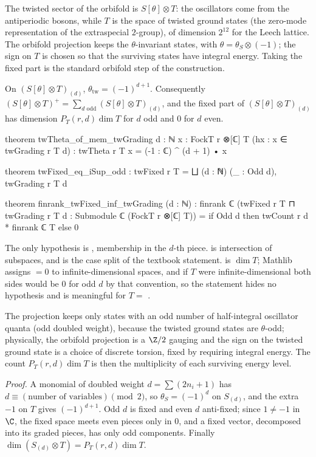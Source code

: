 \begin{physics}
The twisted sector of the orbifold is $S[\theta]\otimes T$: the oscillators come from the antiperiodic bosons, while $T$ is the space of twisted ground states (the zero-mode representation of the extraspecial $2$-group), of dimension $2^{12}$ for the Leech lattice. The orbifold projection keeps the $\theta$-invariant states, with $\theta=\theta_S\otimes(-1)$; the sign on $T$ is chosen so that the surviving states have integral energy. Taking the fixed part is the standard orbifold step of the construction.
\end{physics}

\begin{proposition}\label{ch05:prop:twtheta}
On $(S[\theta]\otimes T)_{(d)}$, $\theta_{\mathrm{tw}} = (-1)^{d+1}$. Consequently
$(S[\theta]\otimes T)^+ = \sum_{d\text{ odd}}(S[\theta]\otimes T)_{(d)}$, and the fixed part of
$(S[\theta]\otimes T)_{(d)}$ has dimension $P_T(r,d)\dim T$ for $d$ odd and $0$ for $d$ even.
\end{proposition}
\begin{leancode}
theorem twTheta_of_mem_twGrading {d : ℕ} {x : FockT r ⊗[ℂ] T} (hx : x ∈ twGrading r T d) :
    twTheta r T x = (-1 : ℂ) ^ (d + 1) • x

theorem twFixed_eq_iSup_odd : twFixed r T = ⨆ (d : ℕ) (_ : Odd d), twGrading r T d

theorem finrank_twFixed_inf_twGrading (d : ℕ) :
    finrank ℂ (twFixed r T ⊓ twGrading r T d : Submodule ℂ (FockT r ⊗[ℂ] T))
      = if Odd d then twCount r d * finrank ℂ T else 0
\end{leancode}
\begin{dictionary}
The only hypothesis is , membership in the $d$-th piece.  is intersection of subspaces,
and  is the case split of the textbook statement.  is $\dim T$;
Mathlib assigns  $=0$ to infinite-dimensional spaces, and if $T$ were
infinite-dimensional both sides would be $0$ for odd $d$ by that convention, so the statement hides no
hypothesis and is meaningful for $T = $ .
\end{dictionary}

\begin{physics}
The projection keeps only states with an odd number of half-integral oscillator quanta (odd doubled weight), because the twisted ground states are $\theta$-odd; physically, the orbifold projection is a $\Z/2$ gauging and the sign on the twisted ground state is a choice of discrete torsion, fixed by requiring integral energy. The count $P_T(r,d)\dim T$ is then the multiplicity of each surviving energy level.
\end{physics}
\noindent\emph{Proof.} A monomial of doubled weight $d = \sum(2n_i+1)$ has $d\equiv(\text{number of
variables})\pmod 2$, so $\theta_S = (-1)^d$ on $S_{(d)}$, and the extra $-1$ on $T$ gives $(-1)^{d+1}$.
Odd $d$ is fixed and even $d$ anti-fixed; since $1\ne-1$ in $\C$, the fixed space meets even pieces only
in $0$, and a fixed vector, decomposed into its graded pieces, has only odd components. Finally
$\dim(S_{(d)}\otimes T) = P_T(r,d)\dim T$.

